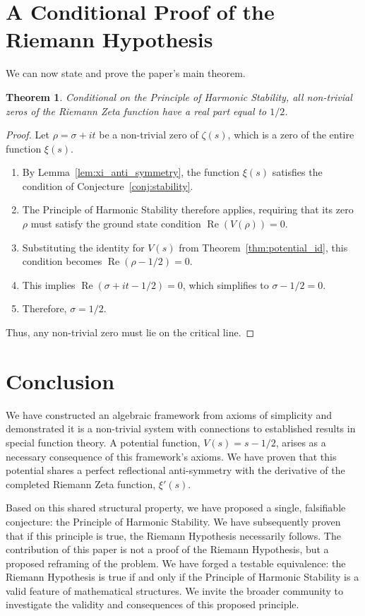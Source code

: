 \documentclass{amsart}
\theoremstyle{plain}
\newtheorem{theorem}{Theorem}[section]
\theoremstyle{definition}
\theoremstyle{remark}
\DeclareMathOperator{\re}{Re}
\begin{document}
\section{A Conditional Proof of the Riemann Hypothesis}
We can now state and prove the paper's main theorem.
\begin{theorem}
Conditional on the Principle of Harmonic Stability, all non-trivial zeros of the Riemann Zeta function have a real part equal to $1/2$.
\end{theorem}
\begin{proof}
Let $\rho = \sigma + it$ be a non-trivial zero of $\zeta(s)$, which is a zero of the entire function $\xi(s)$.
\begin{enumerate}
    \item By Lemma~\ref{lem:xi_anti_symmetry}, the function $\xi(s)$ satisfies the condition of Conjecture~\ref{conj:stability}.
    \item The Principle of Harmonic Stability therefore applies, requiring that its zero $\rho$ must satisfy the ground state condition $\re(V(\rho))=0$.
    \item Substituting the identity for $V(s)$ from Theorem~\ref{thm:potential_id}, this condition becomes $\re(\rho - 1/2) = 0$.
    \item This implies $\re(\sigma + it - 1/2) = 0$, which simplifies to $\sigma - 1/2 = 0$.
    \item Therefore, $\sigma = 1/2$.
\end{enumerate}
Thus, any non-trivial zero must lie on the critical line.
\end{proof}

\section{Conclusion}
We have constructed an algebraic framework from axioms of simplicity and demonstrated it is a non-trivial system with connections to established results in special function theory. A potential function, $V(s) = s - 1/2$, arises as a necessary consequence of this framework's axioms. We have proven that this potential shares a perfect reflectional anti-symmetry with the derivative of the completed Riemann Zeta function, $\xi'(s)$.

Based on this shared structural property, we have proposed a single, falsifiable conjecture: the Principle of Harmonic Stability. We have subsequently proven that if this principle is true, the Riemann Hypothesis necessarily follows. The contribution of this paper is not a proof of the Riemann Hypothesis, but a proposed reframing of the problem. We have forged a testable equivalence: the Riemann Hypothesis is true if and only if the Principle of Harmonic Stability is a valid feature of mathematical structures. We invite the broader community to investigate the validity and consequences of this proposed principle.
\end{document}
